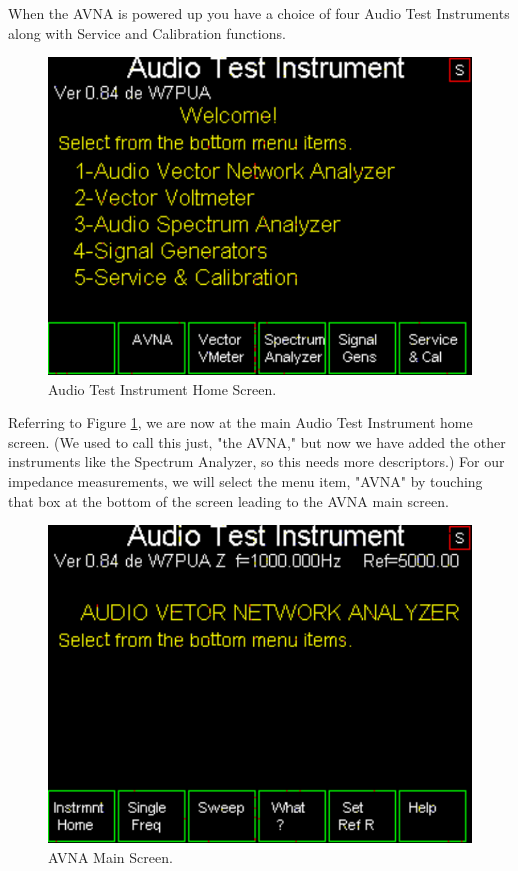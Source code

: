 When the AVNA is powered up you have a choice of four Audio Test Instruments along with Service and Calibration functions.
\begin{figure}[H]
\begin{center}
\includegraphics[scale=0.75]{./images/AVNA_000.pdf}
\caption{Audio Test Instrument Home  Screen.}
\label{AVNA_000-label}
\end{center}
\end{figure}
%
Referring to Figure \ref{AVNA_000-label}, we are now at the main Audio Test Instrument home screen. (We used to call this just, "the AVNA," but now we have added the other instruments like the Spectrum Analyzer, so this needs more descriptors.) For our impedance measurements, we will select the menu item, "AVNA" by touching that box at the bottom of the screen leading to the AVNA main screen.
\begin{figure}[H]
\begin{center}
\includegraphics[scale=0.75]{./images/AVNA_001.pdf}
\caption{AVNA Main  Screen.}
\label{AVNA_001-label}
\end{center}
\end{figure}

